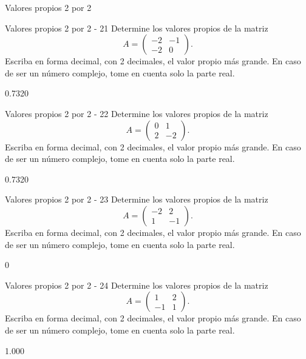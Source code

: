 \documentclass[a4,11pt]{aleph-notas}
\begin{document}
\begin{quiz}{Valores propios 2 por 2}
\begin{numerical}[tolerance=0.01]%
    {Valores propios 2 por 2 - 21}
    Determine los valores propios de la matriz
    \[
    A = \begin{pmatrix}
    -2 & -1 \\
    -2 & 0
    \end{pmatrix}.
    \]
    Escriba en forma decimal, con 2 decimales, el valor propio más grande. En caso de ser un número complejo, tome en cuenta solo la parte real.
    \item[] 0.7320
\end{numerical}

\begin{numerical}[tolerance=0.01]%
    {Valores propios 2 por 2 - 22}
    Determine los valores propios de la matriz
    \[
    A = \begin{pmatrix}
    0 & 1 \\
    2 & -2
    \end{pmatrix}.
    \]
    Escriba en forma decimal, con 2 decimales, el valor propio más grande. En caso de ser un número complejo, tome en cuenta solo la parte real.
    \item[] 0.7320
\end{numerical}

\begin{numerical}[tolerance=0.01]%
    {Valores propios 2 por 2 - 23}
    Determine los valores propios de la matriz
    \[
    A = \begin{pmatrix}
    -2 & 2 \\
    1 & -1
    \end{pmatrix}.
    \]
    Escriba en forma decimal, con 2 decimales, el valor propio más grande. En caso de ser un número complejo, tome en cuenta solo la parte real.
    \item[] 0
\end{numerical}

\begin{numerical}[tolerance=0.01]%
    {Valores propios 2 por 2 - 24}
    Determine los valores propios de la matriz
    \[
    A = \begin{pmatrix}
    1 & 2 \\
    -1 & 1
    \end{pmatrix}.
    \]
    Escriba en forma decimal, con 2 decimales, el valor propio más grande. En caso de ser un número complejo, tome en cuenta solo la parte real.
    \item[] 1.000
\end{numerical}


\end{quiz}
\end{document}
